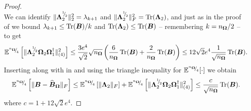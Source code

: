 \begin{proof}
\begin{equation}
    \end{equation}
    We can identify $\lVert \boldsymbol{\Lambda}_2^{{}^{1}{\mskip -5mu/\mskip -3mu}_{2}} \rVert _2^2 = \lambda_{k+1}$ and $\lVert \boldsymbol{\Lambda}_2^{{}^{1}{\mskip -5mu/\mskip -3mu}_{2}} \rVert _F^2 = \operatorname{Tr}(\boldsymbol{\Lambda}_2)$, and just as in the proof of \cite[Lemma 3.1]{meyer-2021-hutch-optimal} we bound $\lambda_{k+1} \leq \operatorname{Tr}(\boldsymbol{B})/k$ and $\operatorname{Tr}(\boldsymbol{\Lambda}_2) \leq \operatorname{Tr}(\boldsymbol{B})$ -- remembering $k = n_{\boldsymbol{\Omega}}/2$ -- to get 
    \begin{equation}
        \mathbb{E}^{{}^{n_{\boldsymbol{\Omega}}}{\mskip -5mu/\mskip -3mu}_{4}}\left[ \lVert \boldsymbol{\Lambda}_2^{{}^{1}{\mskip -5mu/\mskip -3mu}_{2}} \boldsymbol{\Omega}_2 \boldsymbol{\Omega}_1^{\dagger} \rVert _{(4)}^2 \right]
        \leq \frac{3 e^4}{\sqrt{2}}  \sqrt{n_{\boldsymbol{\Omega}}} \left( \frac{6}{n_{\boldsymbol{\Omega}}} \operatorname{Tr}(\boldsymbol{B}) + \frac{2}{n_{\boldsymbol{\Omega}}} \operatorname{Tr}(\boldsymbol{B}) \right)
        \leq 12 \sqrt{2} e^4 \frac{1}{\sqrt{n_{\boldsymbol{\Omega}}}} \operatorname{Tr}(\boldsymbol{B}).
        \label{equ:nystrom-proof-tail-bound}
    \end{equation}
    Inserting  along with  in  and using the triangle inequality for $\mathbb{E}^{{}^{n_{\boldsymbol{\Omega}}}{\mskip -5mu/\mskip -3mu}_{4}}[\cdot]$ we obtain
    \begin{equation}
        \mathbb{E}^{{}^{n_{\boldsymbol{\Omega}}}{\mskip -5mu/\mskip -3mu}_{4}} \left[\lVert \boldsymbol{B} - \widehat{\boldsymbol{B}}_{\boldsymbol{\Omega}} \rVert _F \right]
        \leq \mathbb{E}^{{}^{n_{\boldsymbol{\Omega}}}{\mskip -5mu/\mskip -3mu}_{4}} \left[ \lVert \boldsymbol{\Lambda}_2 \rVert _F \right] + \mathbb{E}^{{}^{n_{\boldsymbol{\Omega}}}{\mskip -5mu/\mskip -3mu}_{4}} \left[ \lVert \boldsymbol{\Lambda}_2^{{}^{1}{\mskip -5mu/\mskip -3mu}_{2}} \boldsymbol{\Omega}_2 \boldsymbol{\Omega}_1^{\dagger} \rVert _{(4)}^2 \right]
        \leq \frac{c}{\sqrt{n_{\boldsymbol{\Omega}}}} \operatorname{Tr}(\boldsymbol{B}).
    \end{equation}
    where $c = 1 + 12 \sqrt{2} e^4 $.


\end{proof}
